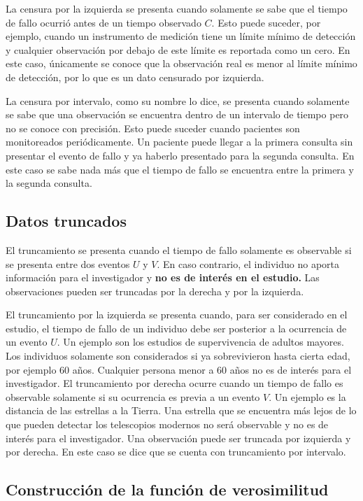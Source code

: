 \documentclass[11pt,a4paper]{article}
\begin{document}
La censura por la izquierda se presenta cuando solamente se sabe que el tiempo de fallo ocurrió antes de un tiempo observado $C$. Esto puede suceder, por ejemplo, cuando un instrumento de medición tiene un límite mínimo de detección y cualquier observación por debajo de este límite es reportada como un cero. En este caso, únicamente se conoce que la observación real es menor al límite mínimo de detección, por lo que es un dato censurado por izquierda.

La censura por intervalo, como su nombre lo dice, se presenta cuando solamente se sabe que una observación se encuentra dentro de un intervalo de tiempo pero no se conoce con precisión. Esto puede suceder cuando pacientes son monitoreados periódicamente. Un paciente puede llegar a la primera consulta sin presentar el evento de fallo y ya haberlo presentado para la segunda consulta. En este caso se sabe nada más que el tiempo de fallo se encuentra entre la primera y la segunda consulta. 

\subsection{Datos truncados}
\label{sec:truncados}

El truncamiento se presenta cuando el tiempo de fallo solamente es observable si se presenta entre dos eventos $U$ y $V$. En caso contrario, el individuo no aporta información para el investigador y \textbf{no es de interés en el estudio.} Las observaciones pueden ser truncadas por la derecha y por la izquierda.

El truncamiento por la izquierda se presenta cuando, para ser considerado en el estudio, el tiempo de fallo de un individuo debe ser posterior  a la ocurrencia de un evento $U$. Un ejemplo son los estudios de supervivencia de adultos mayores. Los individuos solamente son considerados si ya sobrevivieron hasta cierta edad, por ejemplo 60 años. Cualquier persona menor a 60 años no es de interés para el investigador. El truncamiento por derecha ocurre cuando un tiempo de fallo es observable solamente si su ocurrencia es previa a un evento $V$. Un ejemplo es la distancia de las estrellas a la Tierra. Una estrella que se encuentra más lejos de lo que pueden detectar los telescopios modernos no será observable y no es de interés para el investigador. Una observación puede ser truncada por izquierda y por derecha. En este caso se dice que se cuenta con truncamiento por intervalo.

\subsection{Construcción de la función de verosimilitud}
\label{sec:ver}
\end{document}
